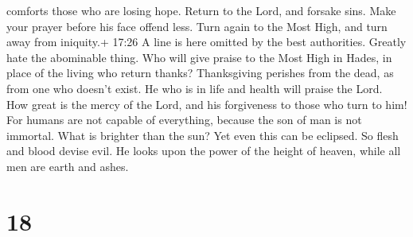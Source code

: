 comforts those who are losing hope.  Return to the Lord,
and forsake sins. Make your prayer before his face offend less.
 Turn again to the Most High, and turn away from iniquity.+
17:26 A line is here omitted by the best authorities. Greatly hate the
abominable thing.  Who will give praise to the Most High in
Hades, in place of the living who return thanks? 
Thanksgiving perishes from the dead, as from one who doesn't exist. He
who is in life and health will praise the Lord.  How great
is the mercy of the Lord, and his forgiveness to those who turn to him!
 For humans are not capable of everything, because the son
of man is not immortal.  What is brighter than the sun? Yet
even this can be eclipsed. So flesh and blood devise evil. 
He looks upon the power of the height of heaven, while all men are earth
and ashes.

\hypertarget{section-14}{%
\section{18}\label{section-14}}

